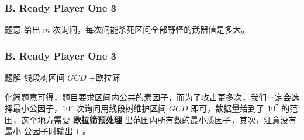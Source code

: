\renewcommand{\problemname}{B. Ready Player One 3}

\begin{frame}\frametitle{\problemname}
	
	\begin{block}{题意}
		给出 $m$ 次询问，每次问能杀死区间全部野怪的武器值是多大。
	\end{block}
\end{frame}

\begin{frame}\frametitle{\problemname}
	
	\begin{block}{题解}
		线段树区间 $GCD$ +欧拉筛

		化简题意可得，题目要求区间内公共的素因子，而为了攻击更多次，我们一定会选择最小公因子，$10^5$ 次询问用线段树维护区间 $ 		GCD$ 即可，数据量给到了 $10^7$ 的范围，这个地方需要 \textbf{欧拉筛预处理} 出范围内所有数的最小质因子，其次，注意没有				最小	公因子时输出 $1$ 。
	\end{block}
\end{frame}